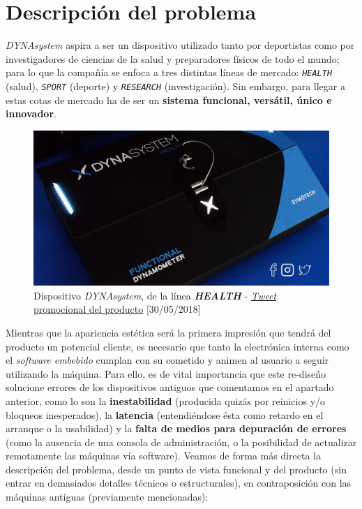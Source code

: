 \chapter{Descripción del problema}

\textit{DYNAsystem} aspira a ser un dispositivo utilizado tanto por deportistas como por investigadores de ciencias de la salud y preparadores físicos de todo el mundo; para lo que la compañía se enfoca a tres distintas líneas de mercado: \texttt{\textit{HEALTH}} (salud), \texttt{\textit{SPORT}} (deporte) y \texttt{\textit{RESEARCH}} (investigación). Sin embargo, para llegar a estas cotas de mercado ha de ser un \textbf{sistema funcional, versátil, único e innovador}.\\

\begin{figure}[H]
	\centering
	\includegraphics[width=0.7\linewidth]{imagenes/dynasystem-blue-floor.jpeg}
	\caption{Dispositivo \textit{DYNAsystem}, de la línea \textbf{\textit{HEALTH}} - \href{https://twitter.com/dynasystem_/status/1001762762111021057}{\textit{Tweet} promocional del producto} [30/05/2018]}
	\label{dynasystem-health}
\end{figure}

Mientras que la apariencia estética será la primera impresión que tendrá del producto un potencial cliente, es necesario que tanto la electrónica interna como el \textit{software embebido} cumplan con su cometido y animen al usuario a seguir utilizando la máquina. Para ello, es de vital importancia que este re-diseño solucione errores de los dispositivos antiguos que comentamos en el apartado anterior, como lo son la \textbf{inestabilidad} (producida quizás por reinicios y/o bloqueos inesperados), la \textbf{latencia} (entendiéndose ésta como retardo en el arranque o la usabilidad) y la \textbf{falta de medios para depuración de errores} (como la ausencia de una consola de administración, o la posibilidad de actualizar remotamente las máquinas vía software). Veamos de forma más directa la descripción del problema, desde un punto de vista funcional y del producto (sin entrar en demasiados detalles técnicos o estructurales), en contraposición con las máquinas antiguas (previamente mencionadas):\\

